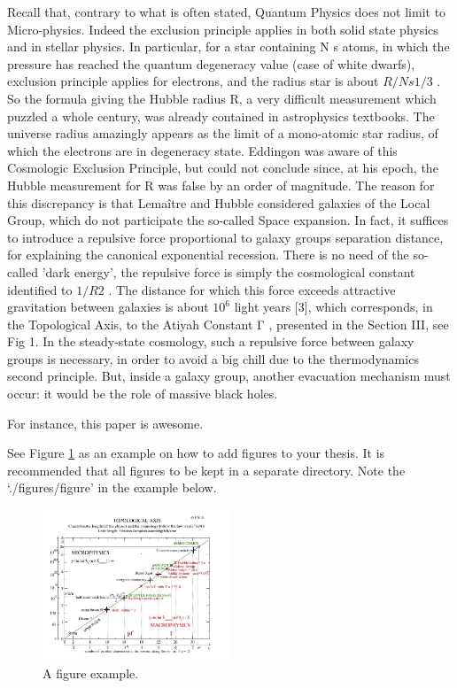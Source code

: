 Recall that, contrary to what is often stated, Quantum Physics does not limit to Micro-physics.
Indeed the exclusion principle applies in both solid state physics and in stellar physics. In particular,
for a star containing N s atoms, in which the pressure has reached the quantum degeneracy value
(case of white dwarfs), exclusion principle applies for electrons, and the radius star is about $R/N s1/3$ .
So the formula giving the Hubble radius R, a very difficult measurement which puzzled a whole
century, was already contained in astrophysics textbooks. The universe radius amazingly appears as
the limit of a mono-atomic star radius, of which the electrons are in degeneracy state. Eddingon was
aware of this Cosmologic Exclusion Principle, but could not conclude since, at his epoch, the
Hubble measurement for R was false by an order of magnitude.
The reason for this discrepancy is that Lemaître and Hubble considered galaxies of the Local
Group, which do not participate the so-called Space expansion. In fact, it suffices to introduce a
repulsive force proportional to galaxy groups separation distance, for explaining the canonical
exponential recession. There is no need of the so-called 'dark energy', the repulsive force is simply
the cosmological constant identified to $1/R 2$ . The distance for which this force exceeds attractive
gravitation between galaxies is about $10^6$ light years [3], which corresponds, in the Topological
Axis, to the Atiyah Constant Γ , presented in the Section III, see Fig 1.
In the steady-state cosmology, such a repulsive force between galaxy groups is necessary, in
order to avoid a big chill due to the thermodynamics second principle. But, inside a galaxy group,
another evacuation mechanism must occur: it would be the role of massive black holes.

For instance, this paper \cite{fm1} is awesome.

See Figure \ref{fig:figure_label} as an example on how to add figures to your thesis.
It is recommended that all figures to be kept in a separate directory.
Note the `./figures/figure' in the example below.


\begin{figure}
\centering
\includegraphics[width=0.5\textwidth]{./figures/figure}
\caption{A figure example.}
\label{fig:figure_label}
\end{figure}


